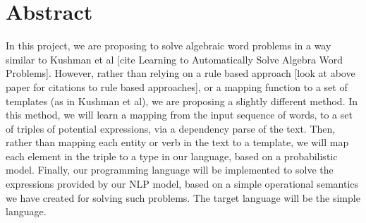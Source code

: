\section{Abstract}
In this project, we are proposing to solve algebraic word problems in a way similar to Kushman et al [cite Learning to Automatically Solve Algebra Word Problems]. However, rather than relying on a rule based approach [look at above paper for citations to rule based approaches], or a mapping function to a set of templates (as in Kushman et al), we are proposing a slightly different method. In this method, we will learn a mapping from the input sequence of words, to a set of triples of potential expressions, via a dependency parse of the text. Then, rather than mapping each entity or verb in the text to a template, we will map each element in the triple to a type in our language, based on a probabilistic model.
Finally, our programming language will be implemented to solve the expressions provided by our NLP model, based on a simple operational semantics we have created for solving such problems. The target language will be the simple \IMP language.